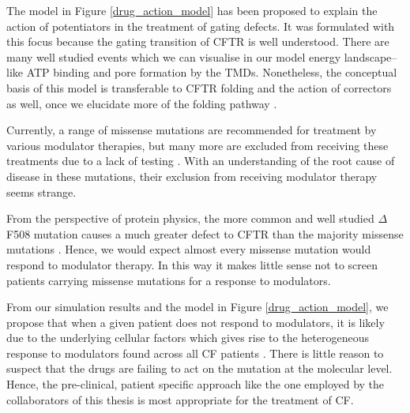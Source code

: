 The model in Figure \ref {drug_action_model} has been proposed to explain the action of potentiators in the treatment of gating defects. It was formulated with this focus because the gating transition of CFTR is well understood. There are many well studied events which we can visualise in our model energy landscape--like ATP binding and pore formation by the TMDs. Nonetheless, the conceptual basis of this model is transferable to CFTR folding and the action of correctors as well, once we elucidate more of the folding pathway \cite{krainer2018, kleizen2021, kleizen2020, padanyi2022, fiedorczuk2022}. 

Currently, a range of missense mutations are recommended for treatment by various modulator therapies, but many more are excluded from receiving these treatments due to a lack of testing \cite{trikafta_FDA_info, kalydeco_FDA_approval, vangoor2014}. With an understanding of the root cause of disease in these mutations, their exclusion from receiving modulator therapy seems strange.

From the perspective of protein physics, the more common and well studied $\Delta$F508 mutation causes a much greater defect to CFTR than the majority missense mutations \cite{bahia2021}. Hence, we would expect almost every missense mutation would respond to modulator therapy. In this way it makes little sense not to screen patients carrying missense mutations for a response to modulators. 

From our simulation results and the model in Figure \ref{drug_action_model}, we propose that when a given patient does not respond to modulators, it is likely due to the underlying cellular factors which gives rise to the heterogeneous response to modulators found across all CF patients \cite{boyle2014, donaldson2018, keating2018, matthes2018}. There is little reason to suspect that the drugs are failing to act on the mutation at the molecular level. Hence, the pre-clinical, patient specific approach like the one employed by the collaborators of this thesis is most appropriate for the treatment of CF. 


